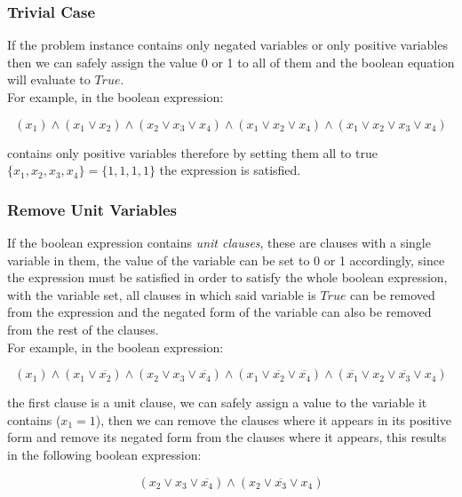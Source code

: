 	\subsubsection{Trivial Case}

	If the problem instance contains only negated variables or only positive variables then we can safely assign the value 0 or 1 to all of them and the boolean equation will evaluate to $True$.
	\\For example, in the boolean expression:

	\begin{equation*}
		(x_1) \land (x_1 \lor x_2) \land (x_2 \lor x_3 \lor x_4) \land (x_1 \lor x_2 \lor x_4) \land (x_1 \lor x_2 \lor x_3 \lor x_4)
	\end{equation*}

	contains only positive variables therefore by setting them all to true $\{x_1,x_2,x_3,x_4\}=\{1,1,1,1\}$ the expression is satisfied.

	\subsubsection{Remove Unit Variables}

	If the boolean expression contains \textit{unit clauses}, these are clauses with a single variable in them, the value of the variable can be set to 0 or 1 accordingly, since the expression must be satisfied in order to satisfy the whole boolean expression, with the variable set, all clauses in which said variable is $True$ can be removed from the expression and the negated form of the variable can also be removed from the rest of the clauses.
	\\For example, in the boolean expression:

	\begin{equation*}
	 	(x_1) \land (x_1 \lor \overline{x_2}) \land (x_2 \lor x_3 \lor \overline{x_4}) \land (x_1 \lor \overline{x_2} \lor \overline{x_4}) \land (\overline{x_1} \lor x_2 \lor \overline{x_3} \lor x_4)
	\end{equation*}

	the first clause is a unit clause, we can safely assign a value to the variable it contains ($x_1=1$), then we can remove the clauses where it appears in its positive form and remove its negated form from the clauses where it appears, this results in the following boolean expression:

	\begin{equation*}
	 	(x_2 \lor x_3 \lor \overline{x_4}) \land (x_2 \lor \overline{x_3} \lor x_4)
	\end{equation*}	

